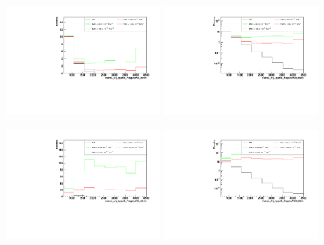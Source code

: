 \begin{figure}[h]
  \begin{center}
	\includegraphics[width=0.45\textwidth]{Plots/aQGC_kinematics/mass_lvj_type0_PuppiAK8_8bin_FM7.pdf}%
	\includegraphics[width=0.45\textwidth]{Plots/aQGC_kinematics/mass_lvj_type0_PuppiAK8_8bin_FM7_log.pdf}\\	
    \caption{}
  \end{center}
\end{figure}
\begin{figure}[h]
  \begin{center}
	\includegraphics[width=0.45\textwidth]{Plots/aQGC_kinematics/mass_lvj_type0_PuppiAK8_8bin_FS0.pdf}%
	\includegraphics[width=0.45\textwidth]{Plots/aQGC_kinematics/mass_lvj_type0_PuppiAK8_8bin_FS0_log.pdf}\\	
    \caption{}
  \end{center}
\end{figure}
